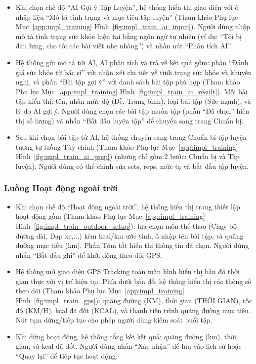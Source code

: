 \begin{itemize}
    \item Khi chọn chế độ ``AI Gợi ý Tập Luyện'', hệ thống hiển thị giao diện với ô nhập liệu ``Mô tả tình trạng và mục tiêu tập luyện'' (Tham khảo Phụ lục Mục~\ref{app:impl_training} Hình~\ref{fig:impl_train_ai_input}). Người dùng nhập mô tả tình trạng sức khỏe hiện tại bằng ngôn ngữ tự nhiên (ví dụ: ``Tôi bị đau lưng, cho tôi các bài viết nhẹ nhàng'') và nhấn nút ``Phân tích AI''.


    \item Hệ thống gửi mô tả tới AI, AI phân tích và trả về kết quả gồm: phần ``Đánh giá sức khỏe từ bác sĩ'' với nhận xét chi tiết về tình trạng sức khỏe và khuyến nghị, và phần ``Bài tập gợi ý'' với danh sách bài tập phù hợp (Tham khảo Phụ lục Mục~\ref{app:impl_training} Hình~\ref{fig:impl_train_ai_result}). Mỗi bài tập hiển thị: tên, nhãn mức độ (Dễ, Trung bình), loại bài tập (Sức mạnh), và lý do AI gợi ý. Người dùng chọn các bài tập muốn tập (phần ``Đã chọn'' hiển thị số lượng) và nhấn ``Bắt đầu luyện tập'' để chuyển sang trang Chuẩn bị.


    \item Sau khi chọn bài tập từ AI, hệ thống chuyển sang trang Chuẩn bị tập luyện tương tự luồng Tùy chỉnh (Tham khảo Phụ lục Mục~\ref{app:impl_training} Hình~\ref{fig:impl_train_ai_prep}) (nhưng chỉ gồm 2 bước: Chuẩn bị và Tập luyện). Người dùng có thể chỉnh sửa sets, reps, mức tạ và bắt đầu tập luyện.

\end{itemize}

\subsubsection{Luồng Hoạt động ngoài trời}

\begin{itemize}
    \item Khi chọn chế độ ``Hoạt động ngoài trời'', hệ thống hiển thị trang thiết lập hoạt động gồm (Tham khảo Phụ lục Mục~\ref{app:impl_training} Hình~\ref{fig:impl_train_outdoor_setup}): lựa chọn môn thể thao (Chạy bộ đường dài, Đạp xe,...) kèm kcal/km ước tính, ô nhập tên bài tập, và quãng đường mục tiêu (km). Phần Tóm tắt hiển thị thông tin đã chọn. Người dùng nhấn ``Bắt đầu ghi'' để khởi động theo dõi GPS.


    \item Hệ thống mở giao diện GPS Tracking toàn màn hình hiển thị bản đồ thời gian thực với vị trí hiện tại. Phía dưới bản đồ, hệ thống hiển thị các thông số theo dõi (Tham khảo Phụ lục Mục~\ref{app:impl_training} Hình~\ref{fig:impl_train_gps}): quãng đường (KM), thời gian (THỜI GIAN), tốc độ (KM/H), kcal đã đốt (KCAL), và thanh tiến trình quãng đường mục tiêu. Nút tạm dừng/tiếp tục cho phép người dùng kiểm soát buổi tập.


    \item Khi dừng hoạt động, hệ thống tổng kết kết quả: quãng đường (km), thời gian, và kcal đã đốt. Người dùng nhấn ``Xác nhận'' để lưu vào lịch sử hoặc ``Quay lại'' để tiếp tục hoạt động.

\end{itemize}

